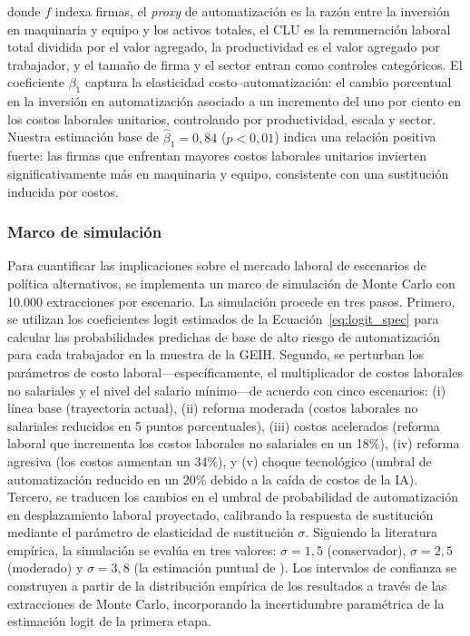 \documentclass{article}
\begin{document}
\noindent donde $f$ indexa firmas, el \textit{proxy} de automatizaci\'on es la raz\'on entre la inversi\'on en maquinaria y equipo y los activos totales, el CLU es la remuneraci\'on laboral total dividida por el valor agregado, la productividad es el valor agregado por trabajador, y el tama\~no de firma y el sector entran como controles categ\'oricos. El coeficiente $\beta_1$ captura la elasticidad costo--automatizaci\'on: el cambio porcentual en la inversi\'on en automatizaci\'on asociado a un incremento del uno por ciento en los costos laborales unitarios, controlando por productividad, escala y sector. Nuestra estimaci\'on base de $\hat{\beta}_1 = 0,84$ ($p < 0,01$) indica una relaci\'on positiva fuerte: las firmas que enfrentan mayores costos laborales unitarios invierten significativamente m\'as en maquinaria y equipo, consistente con una sustituci\'on inducida por costos.

\subsubsection*{Marco de simulaci\'on}

Para cuantificar las implicaciones sobre el mercado laboral de escenarios de pol\'itica alternativos, se implementa un marco de simulaci\'on de Monte Carlo con 10.000 extracciones por escenario. La simulaci\'on procede en tres pasos. Primero, se utilizan los coeficientes logit estimados de la Ecuaci\'on~\ref{eq:logit_spec} para calcular las probabilidades predichas de base de alto riesgo de automatizaci\'on para cada trabajador en la muestra de la GEIH. Segundo, se perturban los par\'ametros de costo laboral---espec\'ificamente, el multiplicador de costos laborales no salariales y el nivel del salario m\'inimo---de acuerdo con cinco escenarios: (i) l\'inea base (trayectoria actual), (ii) reforma moderada (costos laborales no salariales reducidos en 5 puntos porcentuales), (iii) costos acelerados (reforma laboral que incrementa los costos laborales no salariales en un 18\%), (iv) reforma agresiva (los costos aumentan un 34\%), y (v) choque tecnol\'ogico (umbral de automatizaci\'on reducido en un 20\% debido a la ca\'ida de costos de la IA). Tercero, se traducen los cambios en el umbral de probabilidad de automatizaci\'on en desplazamiento laboral proyectado, calibrando la respuesta de sustituci\'on mediante el par\'ametro de elasticidad de sustituci\'on $\sigma$. Siguiendo la literatura emp\'irica, la simulaci\'on se eval\'ua en tres valores: $\sigma = 1,5$ (conservador), $\sigma = 2,5$ (moderado) y $\sigma = 3,8$ (la estimaci\'on puntual de \cite{cheng2021elasticity}). Los intervalos de confianza se construyen a partir de la distribuci\'on emp\'irica de los resultados a trav\'es de las extracciones de Monte Carlo, incorporando la incertidumbre param\'etrica de la estimaci\'on logit de la primera etapa.
\end{document}

